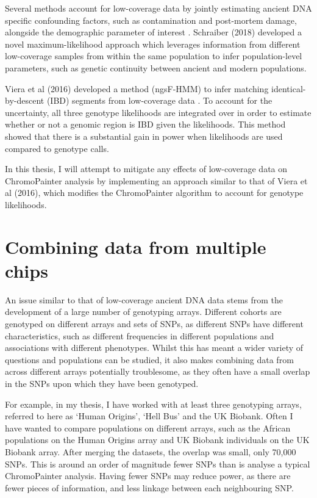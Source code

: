 Several methods account for low-coverage data by jointly estimating ancient DNA specific confounding factors, such as contamination and  post-mortem damage, alongside the demographic parameter of interest \cite{Racimo2016}. Schraiber (2018) \cite{Schraiber2018} developed a novel maximum-likelihood approach which leverages information from different low-coverage samples from within the same population to infer population-level parameters, such as genetic continuity between ancient and modern populations.  
 
Viera et al (2016) developed a method (ngsF-HMM) to infer matching identical-by-descent (IBD) segments from low-coverage data \cite{Vieira2016}. To account for the uncertainty, all three genotype likelihoods are integrated over in order to estimate whether or not a genomic region is IBD given the likelihoods. This method showed that there is a substantial gain in power when likelihoods are used compared to genotype calls.  

In this thesis, I will attempt to mitigate any effects of low-coverage data on ChromoPainter analysis by implementing an approach similar to that of Viera et al (2016), which modifies the ChromoPainter algorithm to account for genotype likelihoods.


\section{Combining data from multiple chips}

An issue similar to that of low-coverage ancient DNA data stems from the development of a large number of genotyping arrays. Different cohorts are genotyped on different arrays and sets of SNPs, as different SNPs have different characteristics, such as different frequencies in different populations and associations with different phenotypes. Whilst this has meant a wider variety of questions and populations can be studied, it also makes combining data from across different arrays potentially troublesome, as they often have a small overlap in the SNPs upon which they have been genotyped.

For example, in my thesis, I have worked with at least three genotyping arrays, referred to here as `Human Origins', `Hell Bus' and the UK Biobank. Often I have wanted to compare populations on different arrays, such as the African populations on the Human Origins array and UK Biobank individuals on the UK Biobank array. After merging the datasets, the overlap was small, only 70,000 SNPs. This is around an order of magnitude fewer SNPs than is analyse a typical ChromoPainter analysis. Having fewer SNPs may reduce power, as there are fewer pieces of information, and less linkage between each neighbouring SNP.

